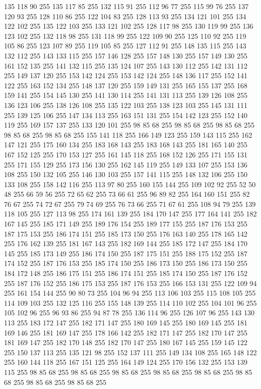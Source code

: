 135 118 90 255 135 117 85 255 132 115 91 255 112 96 77 255 115 99 76 255 137 120 93 255 128 110 86 255 122 104 83 255 128 113 93 255 134 121 101 255 134 122 102 255 135 122 103 255 133 121 102 255 128 117 98 255 130 119 99 255 136 123 102 255 132 118 98 255 131 118 99 255 122 109 90 255 125 110 92 255 119 105 86 255 123 107 89 255 119 105 85 255 127 112 91 255 148 135 115 255 143 132 112 255 143 133 115 255 157 146 128 255 157 148 130 255 157 149 130 255 161 152 135 255 141 132 115 255 135 124 107 255 143 130 112 255 142 131 112 255 149 137 120 255 153 142 124 255 153 142 124 255 148 136 117 255 152 141 122 255 163 152 134 255 148 137 120 255 159 149 131 255 165 155 137 255 168 159 141 255 154 145 130 255 141 130 114 255 141 131 113 255 139 126 108 255 136 123 106 255 138 126 108 255 135 122 103 255 138 123 103 255 145 131 111 255 139 125 106 255 147 134 113 255 163 151 131 255 154 142 123 255 152 140 119 255 169 157 137 255 133 120 101 255 98 85 68 255 98 85 68 255 98 85 68 255
98 85 68 255 98 85 68 255 155 141 118 255 166 149 123 255 159 143 115 255 162 147 121 255 175 160 134 255 183 168 143 255 183 168 143 255 181 165 140 255 167 152 125 255 170 153 127 255 161 145 118 255 168 152 126 255 171 155 131 255 171 155 129 255 173 156 130 255 162 145 119 255 149 133 107 255 153 136 108 255 150 132 105 255 146 130 103 255 157 141 115 255 148 132 106 255 150 133 108 255 158 142 116 255 113 97 80 255 160 155 144 255 109 102 92 255 52 50 48 255 66 59 56 255 72 65 62 255 73 66 61 255 96 89 82 255 164 160 151 255 82 76 67 255 74 72 67 255 79 74 69 255 76 73 66 255 71 67 61 255 108 94 79 255 139 118 105 255 127 113 98 255 174 161 139 255 184 170 147 255 177 164 141 255 182 167 145 255 185 171 149 255 189 176 154 255 189 177 155 255 187 176 153 255 187 175 153 255 186 174 151 255 185 173 150 255 176 163 140 255 178 165 142 255 176 162 139 255 181 167 143 255 182 169 144 255 185 172 147 255 184 170 145 255 185 173 149 255 186 174 150 255 187 175 151 255
188 175 152 255 187 174 152 255 187 176 153 255 185 174 150 255 186 173 150 255 186 173 150 255 184 172 148 255 186 175 151 255 186 174 151 255 185 174 150 255 187 176 152 255 187 176 152 255 186 175 153 255 187 176 153 255 166 153 131 255 122 109 94 255 161 154 144 255 90 80 73 255 104 96 94 255 113 106 103 255 115 108 105 255 114 109 103 255 132 125 116 255 155 148 139 255 114 110 102 255 104 101 96 255 105 102 96 255 96 93 86 255 94 87 78 255 136 114 96 255 126 107 96 255 143 130 113 255 183 172 147 255 182 171 147 255 180 169 145 255 180 169 145 255 181 169 146 255 181 169 147 255 178 166 142 255 182 171 147 255 182 170 147 255 181 169 147 255 182 170 148 255 182 170 147 255 180 167 145 255 159 145 122 255 150 137 113 255 135 121 98 255 152 137 111 255 149 134 108 255 165 148 122 255 160 144 118 255 167 151 125 255 164 149 124 255 170 156 132 255 153 139 115 255 98 85 68 255 98 85 68 255 98 85 68 255 98 85 68 255 98 85 68 255 98 85 68 255 98 85 68 255 98 85 68 255
